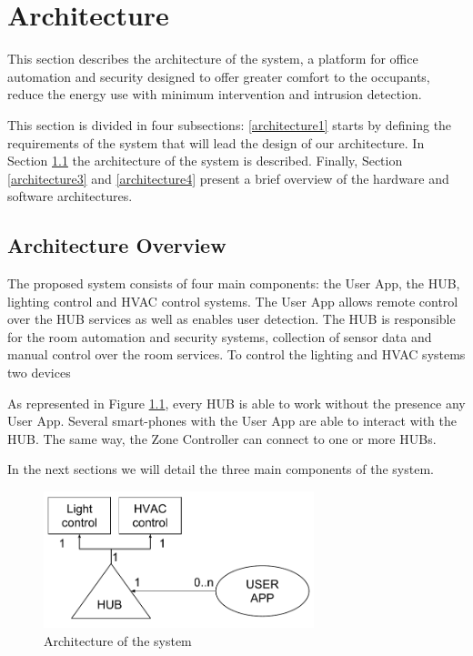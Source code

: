 \chapter{Architecture}
\label{chapter:architecture}

This section describes the architecture of the system, a platform for office automation and security designed to offer greater comfort to the occupants, reduce the energy use with minimum intervention and intrusion detection.

This section is divided in four subsections: \ref{architecture1} starts by defining the requirements of the system that will lead the design of our architecture. In Section \ref{architecture2} the architecture of the system is described. Finally, Section \ref{architecture3} and \ref{architecture4} present a brief overview of the hardware and software architectures.



\section{Architecture Overview}\label{architecture2} 




The proposed system consists of four main components: the User App, the HUB, lighting control and \ac{HVAC} control systems. The User App allows remote control over the HUB services as well as enables user detection. The HUB is responsible for the room automation and security systems, collection of sensor data and manual control over the room services. To control the lighting and \ac{HVAC} systems two devices  

As represented in Figure \ref{architecture_system}, every HUB is able to work without the presence any User App. Several smart-phones with the User App are able to interact with the HUB. The same way, the Zone Controller can connect to one or more HUBs.

In the next sections we will detail the three main components of the system.

\begin{figure}[h]
\centering
\includegraphics[width=0.7\textwidth]{Figures/system_architecture}
\caption{Architecture of the system}
\label{architecture_system}
\end{figure}


